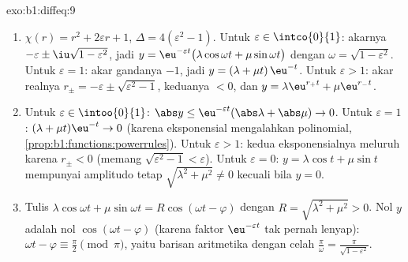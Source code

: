 \begin{solution}{exo:b1:diffeq:9}
\begin{enumerate}
  \item $\chi(r) = r^2 + 2\varepsilon r + 1$, $\Delta = 4(\varepsilon^2
        - 1)$.
        Untuk $\varepsilon \in \intco{0}{1}$: akarnya $-\varepsilon \pm
        \iu\sqrt{1 - \varepsilon^2}$, jadi
        $y = \eu^{-\varepsilon t}\bigl(\lambda\cos\omega t +
        \mu\sin\omega t\bigr)$ dengan $\omega = \sqrt{1 -
        \varepsilon^2}$.
        Untuk $\varepsilon = 1$: akar gandanya $-1$, jadi $y = (\lambda + \mu
        t)\,\eu^{-t}$.
        Untuk $\varepsilon > 1$: akar realnya $r_\pm = -\varepsilon \pm
        \sqrt{\varepsilon^2 - 1}$, keduanya $< 0$, dan $y =
        \lambda\eu^{r_+t} + \mu\eu^{r_-t}$.
  \item Untuk $\varepsilon \in \intoo{0}{1}$: $\abs y \leq
        \eu^{-\varepsilon t}(\abs\lambda + \abs\mu) \to 0$. Untuk
        $\varepsilon = 1$: $(\lambda + \mu t)\eu^{-t} \to 0$
        (karena eksponensial mengalahkan polinomial,
        \cref{prop:b1:functions:powerrules}). Untuk $\varepsilon > 1$:
        kedua eksponensialnya meluruh karena $r_\pm < 0$ (memang
        $\sqrt{\varepsilon^2 - 1} < \varepsilon$). Untuk $\varepsilon =
        0$: $y = \lambda\cos t + \mu\sin t$ mempunyai amplitudo tetap
        $\sqrt{\lambda^2 + \mu^2} \neq 0$ kecuali bila $y = 0$.
  \item Tulis $\lambda\cos\omega t + \mu\sin\omega t =
        R\cos(\omega t - \varphi)$ dengan $R = \sqrt{\lambda^2 + \mu^2}
        > 0$. Nol $y$ adalah nol $\cos(\omega t -
        \varphi)$ (karena faktor $\eu^{-\varepsilon t}$ tak pernah
        lenyap): $\omega t - \varphi \equiv \frac\pi2 \pmod \pi$,
        yaitu barisan aritmetika dengan celah $\frac{\pi}{\omega} =
        \frac{\pi}{\sqrt{1 - \varepsilon^2}}$.
\end{enumerate}
\end{solution}

